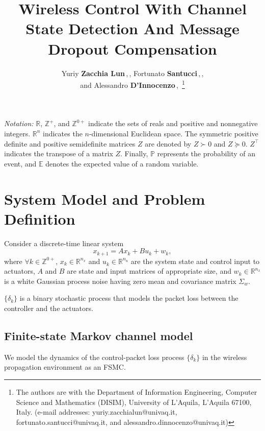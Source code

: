 \documentclass[journal,twoside,web]{ieeecolor}
\title{Wireless Control With Channel State Detection And Message Dropout Compensation}
\author{Yuriy \textbf{Zacchia Lun}\,\textsuperscript{\orcidlink{0000-0002-9408-8773}},\,\IEEEmembership{Member, IEEE}, Fortunato \textbf{Santucci}\,\textsuperscript{\orcidlink{0000-0002-0229-6277}},\,\IEEEmembership{Senior Member, IEEE},\\ and Alessandro \textbf{D'Innocenzo}\,\textsuperscript{\orcidlink{0000-0002-5239-0894}},\,\IEEEmembership{Member, IEEE}
\thanks{The authors are with the 
Department of Information Engineering, Computer Science and Mathematics (DISIM), University of L'Aquila, L'Aquila 67100, Italy. (e-mail addresses:
        {yuriy.zacchialun@univaq.it},\\ {fortunato.santucci@univaq.it}, and {alessandro.dinnocenzo@univaq.it})}%
}
\begin{document}
\maketitle
\thispagestyle{empty}
\pagestyle{empty}

\textit{Notation:} $\mathbb{R}$, $\mathbb{Z}^{+}$, and $\mathbb{Z}^{0+}$ indicate the sets of reals and positive and nonnegative integers. $\mathbb{R}^{n}$ indicates the $n$-dimensional Euclidean space. The symmetric positive definite and positive semidefinite matrices $Z$ are denoted by $Z\succ 0$ and $Z\succeq 0$. $Z^{\top}$ indicates the transpose of a matrix $Z$. Finally, $\mathbb{P}$ represents the probability of an event, and $\mathbb{E}$ denotes the expected value of a random variable.
\section{System Model and Problem Definition}\label{sec:model}
Consider a discrete-time linear system
\begin{equation}\label{eq:state}
        x_{k+1} = A x_{k} + B u_{k}^{} + w_{k},
\end{equation}
where $\forall k \!\in\! \mathbb{Z}^{0+}$, $x_k\!\in\!\mathbb{R}^{n_x}$ and $u_k^{}\!\in\!\mathbb{R}^{n_u}$ are the system state and control input to actuators, $A$ and $B$ are state and input matrices of appropriate size, and $w_k\!\in\!\mathbb{R}^{n_x}$ is a white Gaussian process noise having zero mean and covariance matrix $\Sigma_w$.

$\{\delta_k\}$ is a binary stochastic process that models the packet loss between the controller and the actuators.

\subsection{Finite-state Markov channel model}\label{subsec:fsmc}
We model the dynamics of the control-packet loss process $\{\delta_k\}$ in the wireless propagation environment as an FSMC. 
\end{document}
